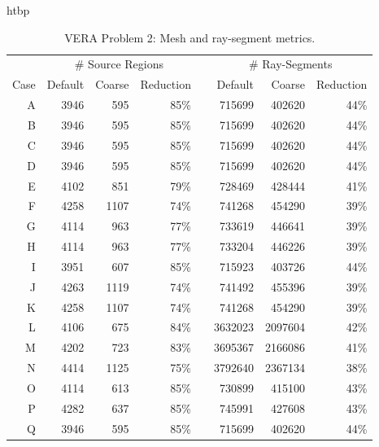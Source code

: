 {{{      \begin{table}{htbp}
        \centering
        \caption{VERA Problem 2: Mesh and ray-segment metrics.\label{tab:LSMOC:Lattices:Mesh}}
        \small
        \begin{tabular}{rrrrrrrr}\toprule
                & \multicolumn{3}{c}{\# Source Regions} &\phantom{a}& \multicolumn{3}{c}{\# Ray-Segments}\\\cline{2-4}\cline{6-8}
           Case & Default & Coarse & Reduction && Default & Coarse & Reduction\\\midrule
           A  & 3946  & 595	  & 85\%  && 715699  & 402620  & 44\%\\
           B  & 3946  & 595	  & 85\%  && 715699  & 402620  & 44\%\\
           C  & 3946  & 595	  & 85\%  && 715699  & 402620  & 44\%\\
           D  & 3946  & 595	  & 85\%  && 715699  & 402620  & 44\%\\
           E  & 4102  & 851	  & 79\%  && 728469  & 428444  & 41\%\\
           F  & 4258  & 1107  & 74\%  && 741268  & 454290  & 39\%\\
           G  & 4114  & 963	  & 77\%  && 733619  & 446641  & 39\%\\
           H  & 4114  & 963	  & 77\%  && 733204  & 446226  & 39\%\\
           I  & 3951  & 607	  & 85\%  && 715923  & 403726  & 44\%\\
           J  & 4263  & 1119  & 74\%  && 741492  & 455396  & 39\%\\
           K  & 4258  & 1107  & 74\%  && 741268  & 454290  & 39\%\\
           L  & 4106  & 675	  & 84\%  && 3632023 & 2097604 & 42\%\\
           M  & 4202  & 723	  & 83\%  && 3695367 & 2166086 & 41\%\\
           N  & 4414  & 1125  & 75\%  && 3792640 & 2367134 & 38\%\\
           O  & 4114  & 613	  & 85\%  && 730899  & 415100  & 43\%\\
           P  & 4282  & 637	  & 85\%  && 745991  & 427608  & 43\%\\
           Q  & 3946  & 595   & 85\%  && 715699  & 402620  & 44\%\\\bottomrule
        \end{tabular}
      \end{table}

}}}
